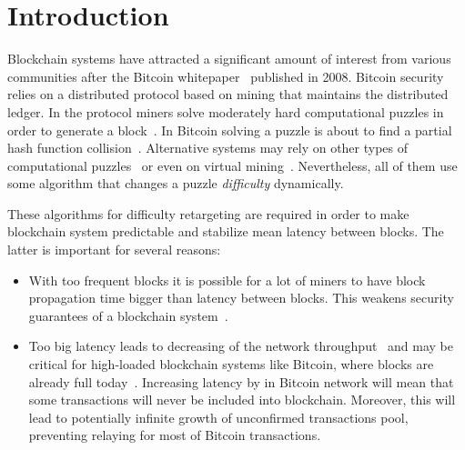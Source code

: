 \documentclass[number,preprint,review]{elsarticle}
\begin{document}
\section{Introduction}
\label{sec:intro}

Blockchain systems have attracted a significant amount of interest from various communities after the Bitcoin whitepaper~\cite{Nakamoto2008} published in 2008.
Bitcoin security relies on a distributed protocol based on mining that maintains the distributed ledger.
In the protocol miners solve moderately hard computational puzzles in order to generate a block~\cite{}. In Bitcoin solving a puzzle is about to find a partial hash function collision~\cite{}.
Alternative systems may rely on other types of computational puzzles~\cite{??} or even on virtual mining~\cite{??}.
Nevertheless, all of them use some algorithm that changes a puzzle \textit{difficulty} dynamically.

These algorithms for difficulty retargeting are required in order to make blockchain system predictable and stabilize mean latency between blocks. The latter is important for several reasons:

\begin{itemize}
\item{With too frequent blocks it is possible for a lot of miners to have block propagation time bigger than latency between blocks. This weakens security guarantees of a blockchain system~\cite{decker2013information,garay2015bitcoin}.}

\item{Too big latency leads to decreasing of the network throughput~\cite{miller2016} and may be critical for high-loaded blockchain systems like Bitcoin, where blocks are already full today~\cite{armstrong2016}. Increasing latency by in Bitcoin network will mean that some transactions will never be included into blockchain. Moreover, this will lead to potentially infinite growth of unconfirmed transactions pool, preventing relaying for most of Bitcoin transactions.}
\end{itemize}
\end{document}
